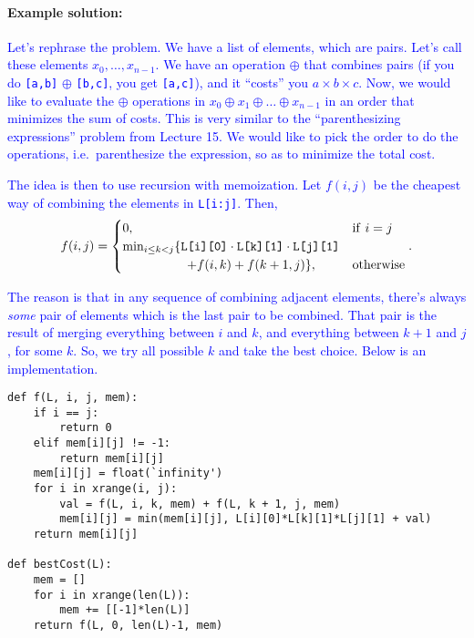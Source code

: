 \documentclass[11pt]{article}
\newcommand{\sol}[1]{\textcolor{blue}{#1}}
\begin{document}
\paragraph{Example solution:}

\sol{Let's rephrase the problem.  We have a list of elements, which
  are pairs.  Let's call these elements $x_0,\ldots,x_{n-1}$.  We have
  an operation $\oplus$ that combines pairs (if you do
  \texttt{[a,b]} $\oplus$ \texttt{[b,c]}, you get \texttt{[a,c]}), and
  it ``costs'' you $a\times b\times c$. Now, we would like to
  evaluate the $\oplus$ operations in $x_0\oplus x_1 \oplus \ldots
  \oplus x_{n-1}$ in an order that minimizes the sum of costs.  This
  is very similar to the ``parenthesizing expressions'' problem from
  Lecture 15.  We would like to pick the order to do the operations,
  i.e.\ parenthesize the expression, so as to minimize the total cost.} 

\sol{The idea is then to use recursion with memoization. Let $f(i,j)$ be
  the cheapest way of combining the elements in \texttt{L[i:j]}.
  Then,
$$
f(i,j) = \begin{cases}
0,\ & \mathrm{if}\ i = j\\
\min_{i\le k < j} \{\texttt{L[i][0]}\cdot\texttt{L[k][1]}\cdot
\texttt{L[j][1]}& \\\hspace*{.7in} + f(i,k) + f(k+1,j)\},\
  & \mathrm{otherwise}
\end{cases} .
$$
}

\sol{
The reason is that in any sequence of combining adjacent elements,
there's always {\em some} pair of elements which is the last pair to
be combined.  That pair is the result of merging everything between
$i$ and $k$, and everything between $k+1$ and $j$, for some $k$.  So,
we try all possible $k$ and take the best choice.  Below is an
implementation.
}

\newpage

\begin{verbatim}
def f(L, i, j, mem):
    if i == j:
        return 0
    elif mem[i][j] != -1:
        return mem[i][j]
    mem[i][j] = float(`infinity')
    for i in xrange(i, j):
        val = f(L, i, k, mem) + f(L, k + 1, j, mem)
        mem[i][j] = min(mem[i][j], L[i][0]*L[k][1]*L[j][1] + val)
    return mem[i][j]

def bestCost(L):
    mem = []
    for i in xrange(len(L)):
        mem += [[-1]*len(L)]
    return f(L, 0, len(L)-1, mem)
\end{verbatim}
\end{document}
